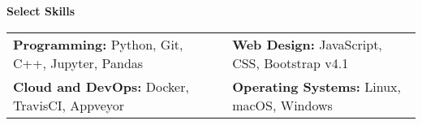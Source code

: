 \documentclass[11pt]{article}
\newcommand{\cvsection}[1]
{
\begin{center}
    \large\textcolor{sectcol}{\textbf{#1}}
\end{center}
}
\begin{document}
\cvsection{Select Skills}

\begin{tabular}{ll}
\textbf{Programming:} Python, Git, C++, Jupyter, Pandas & \textbf{Web Design:} JavaScript, CSS, Bootstrap v4.1 \\
\textbf{Cloud and DevOps:} Docker, TravisCI, Appveyor &
\textbf{Operating Systems:} Linux, macOS, Windows
\end{tabular}

\end{document}

